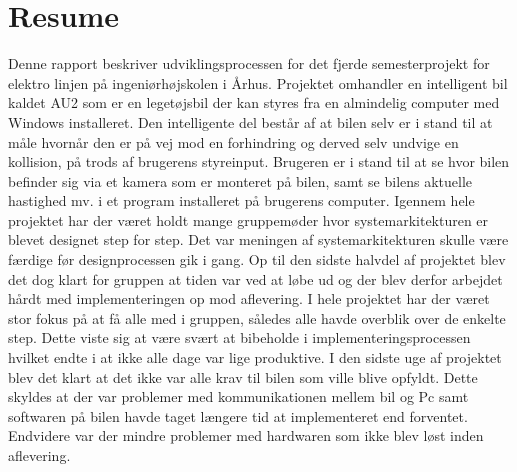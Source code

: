 \chapter{Resume}
\label{ch:Resume}

Denne rapport beskriver udviklingsprocessen for det fjerde semesterprojekt for elektro linjen på ingeniørhøjskolen i Århus. Projektet omhandler en intelligent bil kaldet AU2 som er en legetøjsbil der kan styres fra en almindelig computer med Windows installeret. Den intelligente del består af at bilen selv er i stand til at måle hvornår den er på vej mod en forhindring og derved selv undvige en kollision, på trods af brugerens styreinput. Brugeren er i stand til at se hvor bilen befinder sig via et kamera som er monteret på bilen, samt se bilens aktuelle hastighed mv. i et program installeret på brugerens computer. Igennem hele projektet har der været holdt mange gruppemøder hvor systemarkitekturen er blevet designet step for step. Det var meningen af systemarkitekturen skulle være færdige før designprocessen gik i gang. Op til den sidste halvdel af projektet blev det dog klart for gruppen at tiden var ved at løbe ud og der blev derfor arbejdet hårdt med implementeringen op mod aflevering. I hele projektet har der været stor fokus på at få alle med i gruppen, således alle havde overblik over de enkelte step. Dette viste sig at være svært at bibeholde i implementeringsprocessen hvilket endte i at ikke alle dage var lige produktive. I den sidste uge af projektet blev det klart at det ikke var alle krav til bilen som ville blive opfyldt. Dette skyldes at der var problemer med kommunikationen mellem bil og Pc samt softwaren på bilen havde taget længere tid at implementeret end forventet. Endvidere var der mindre problemer med hardwaren som ikke blev løst inden aflevering.  
\clearpage